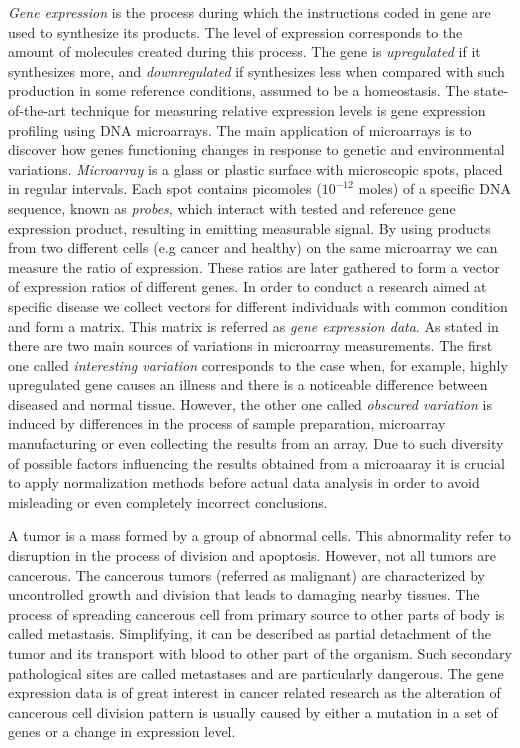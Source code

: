 \documentclass[shortabstract, english, mgr]{iithesis}
\begin{document}
\textit{Gene expression} is the process during which the instructions coded in gene are used to synthesize its products. The level of expression corresponds to the amount of molecules created during this process. The gene is \textit{upregulated} if it synthesizes more, and \textit{downregulated} if synthesizes less when compared with such production in some reference conditions, assumed to be a homeostasis. The state-of-the-art technique for measuring relative expression levels is gene expression profiling using DNA microarrays. The main application of microarrays is to discover how genes functioning changes in response to genetic and environmental variations. \textit{Microarray} is a glass or plastic surface with microscopic spots, placed in regular intervals. Each spot contains picomoles ($10^{-12}$ moles) of a specific DNA sequence, known as \textit{probes}, which interact with tested and reference gene expression product, resulting in emitting measurable signal. By using products from two different cells (e.g cancer and healthy) on the same microarray we can measure the ratio of expression. These ratios are later gathered to form a vector of expression ratios of different genes. In order to conduct a research aimed at specific disease we collect vectors for different individuals with common condition and form a matrix. This matrix is referred as \textit{gene expression data}. As stated in \cite{preprocessing} there are two main sources of variations in microarray measurements. The first one called \textit{interesting variation} corresponds to the case when, for example, highly upregulated gene causes an illness and there is a noticeable difference between diseased and normal tissue. However, the other one called \textit{obscured variation} is induced by differences in the process of sample preparation, microarray manufacturing or even collecting the results from an array. Due to such diversity of possible factors influencing the results obtained from a microaaray it is crucial to apply normalization methods before actual data analysis in order to avoid misleading or even completely incorrect conclusions.

A tumor is a mass formed by a group of abnormal cells. This abnormality refer to disruption in the process of division and apoptosis. However, not all tumors are cancerous. The cancerous tumors (referred as malignant) are characterized by uncontrolled growth and division that leads to damaging nearby tissues. The process of spreading cancerous cell from primary source to other parts of body is called metastasis. Simplifying, it can be described as partial detachment of the tumor and its transport with blood to other part of the organism. Such secondary pathological sites are called metastases and are particularly dangerous. The gene expression data is of great interest in cancer related research as the alteration of cancerous cell division pattern is usually caused by either a mutation in a set of genes or a change in expression level.
\end{document}
